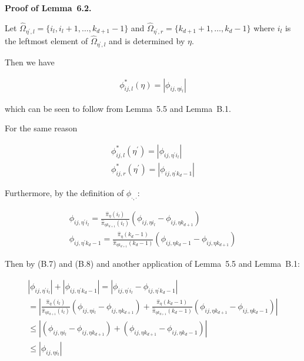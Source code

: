 \documentclass[10pt,a4paper]{article}
\begin{document}
\par\medskip\noindent\textbf{Proof of Lemma 6.2.}\par



Let $\hat{\Omega}_{\eta^{\prime},l}=\{i_{l},i_{l}+1,\dots,k_{d+1}-1\}$ and $\hat{\Omega}_{\eta^{\prime},r}=\{k_{d+1}+1,\dots,k_{d}-1\}$ where $i_{l}$ is the leftmost element of $\hat{\Omega}_{\eta^{\prime},l}$ and is determined by $\eta$.\par




Then we have\par


\[\begin{gathered}
\phi_{ij,l}^{*}(\eta)=|\phi_{ij,\eta i_{l}}|
\end{gathered}\]


which can be seen to follow from Lemma 5.5 and Lemma B.1.\par




For the same reason\par


\[\begin{gathered}
\displaystyle\phi_{ij,l}^{*}(\eta^{\prime}) \displaystyle=|\phi_{ij,\eta^{\prime}i_{l}}| \\
\displaystyle\phi_{ij,r}^{*}(\eta^{\prime}) \displaystyle=|\phi_{ij,\eta^{\prime}k_{d}-1}|
\end{gathered}\]




Furthermore, by the definition of $\phi_{\cdot,\cdot}$:\par


\[\begin{gathered}
\displaystyle\phi_{ij,\eta^{\prime}i_{l}} \displaystyle=\frac{\hat{\pi}_{\eta}(i_{l})}{\hat{\pi}_{\eta k_{d+1}}(i_{l})}(\phi_{ij,\eta i_{l}}-\phi_{ij,\eta k_{d+1}}) \\
\displaystyle\phi_{ij,\eta^{\prime}k_{d}-1} \displaystyle=\frac{\hat{\pi}_{\eta}(k_{d}-1)}{\hat{\pi}_{\eta k_{d+1}}(k_{d}-1)}(\phi_{ij,\eta k_{d}-1}-\phi_{ij,\eta k_{d+1}})
\end{gathered}\]




Then by (B.7) and (B.8) and another application of Lemma 5.5 and Lemma B.1:\par


\[\begin{gathered}
\displaystyle|\phi_{ij,\eta^{\prime}i_{l}}|+|\phi_{ij,\eta^{\prime}k_{d}-1}| \displaystyle=|\phi_{ij,\eta^{\prime}i_{l}}-\phi_{ij,\eta^{\prime}k_{d}-1}| \\
\displaystyle=\left|\frac{\hat{\pi}_{\eta}(i_{l})}{\hat{\pi}_{\eta k_{d+1}}(i_{l})}(\phi_{ij,\eta i_{l}}-\phi_{ij,\eta k_{d+1}})+\frac{\hat{\pi}_{\eta}(k_{d}-1)}{\hat{\pi}_{\eta k_{d+1}}(k_{d}-1)}(\phi_{ij,\eta k_{d+1}}-\phi_{ij,\eta k_{d}-1})\right| \\
\displaystyle\leq\left|(\phi_{ij,\eta i_{l}}-\phi_{ij,\eta k_{d+1}})+(\phi_{ij,\eta k_{d+1}}-\phi_{ij,\eta k_{d}-1})\right| \\
\displaystyle\leq|\phi_{ij,\eta i_{l}}|
\end{gathered}\]
\end{document}
